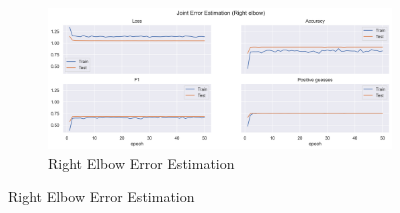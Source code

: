 \begin{figure}[!ht]
\begin{subfigure}[b]{0.47\linewidth}
      \label{fig:v1_leel_jt_ee}
  \end{subfigure}
  \hfill
  \begin{subfigure}[b]{0.47\linewidth}
      \centering
      \includegraphics[width=\textwidth]{figures/Results/v1/jt/Right elbow_ErrorEstimation.png}
      \caption{Right Elbow Error Estimation}
      \label{fig:v1_reel_jt_ee}
  \end{subfigure}
\end{figure}


